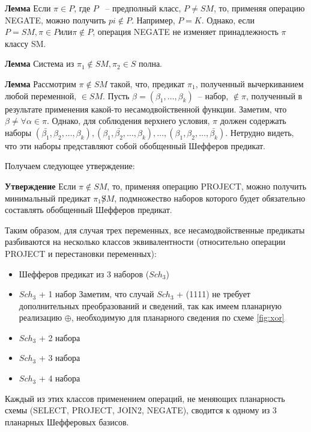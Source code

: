 \documentclass[12pt]{article}
\begin{document}

\textbf{Лемма} Если $\pi \in P$, где $P$ ~-- предполный класс, $P \neq SM$, то, применяя операцию NEGATE,
можно получить $pi \notin P$. Например, $P = K$.
Однако, если $P = SM, \pi \in P или \pi \notin P$, операция NEGATE не изменяет принадлежность $\pi$ классу SM.

\textbf{Лемма} Система из $\pi_1 \notin SM, \pi_2 \in S$ полна.

\label{lemma_sm}
\textbf{Лемма} Рассмотрим $\pi \notin SM$ такой, что, предикат $\pi_1$, полученный вычеркиванием любой переменной, $\in SM$.
Пусть $\beta = (\beta_1, \dots, \beta_k)$~-- набор, $\notin \pi$, полученный в результате применения какой-то несамодвойственной функции.
Заметим, что $\beta \neq \forall \alpha \in \pi$. Однако, для соблюдения верхнего условия, $\pi$ должен содержать наборы 
$(\bar{\beta_1}, \beta_2, \dots, \beta_k), (\beta_1, \bar{\beta_2}, \dots, \beta_k), \dots, (\beta_1, \beta_2, \dots, \bar{\beta_k})$.
Нетрудно видеть, что эти наборы представляют собой обобщенный Шефферов предикат. 

Получаем следующее утверждение: 

\textbf{Утверждение} Если $\pi \notin SM$, то, применяя операцию PROJECT, можно получить минимальный предикат $\pi_1 \not SM$, 
подмножество наборов которого будет обязательно составлять обобщенный Шефферов предикат.

Таким образом, для случая трех переменных, все несамодвойственные предикаты разбиваются на несколько классов эквивалентности 
(относительно операции PROJECT и перестановки переменных): 
\begin{itemize}
\item{Шефферов предикат из 3 наборов ($Sch_3$)}
\item{$Sch_3$ + 1 набор}
Заметим, что случай $Sch_3$ + (1111) не требует дополнительных преобразований и сведений, так как имеем планарную реализацию
$\oplus$, необходимую для планарного сведения по схеме \ref{fig:xor}
\item{$Sch_3$ + 2 набора}
\item{$Sch_3$ + 3 набора}
\item{$Sch_3$ + 4 набора}
\end{itemize}

Каждый из этих классов применением операций, не меняющих планарность схемы (SELECT, PROJECT, JOIN2, NEGATE), сводится к одному из 3
планарных Шефферовых базисов.
\end{document}
